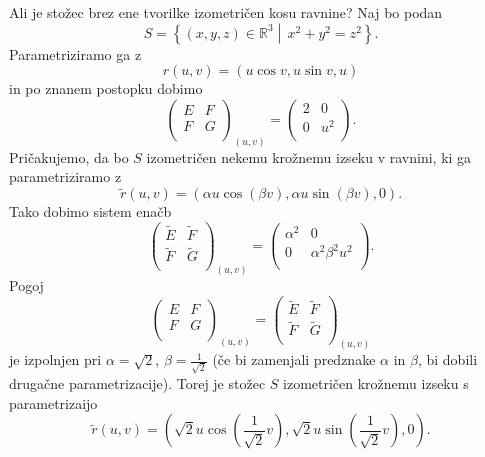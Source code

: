 \begin{primer}
 Ali je stožec brez ene tvorilke izometričen kosu ravnine? Naj bo podan 
 \begin{equation*} S = \left\{ (x,y,z) \in \mathbb{R}^3 \middle|\, x^2 + y^2  = z^2 \right\}.\end{equation*}
 Parametriziramo ga z
 \begin{equation*} r(u,v) = (u \cos v, u \sin v, u) \end{equation*}in po znanem postopku dobimo 
 \begin{equation*} \begin{pmatrix}
  E & F\\
  F & G\\
 \end{pmatrix}_{(u,v)} 
 = \begin{pmatrix}
  2 & 0\\
  0 & u^2\\
 \end{pmatrix}.\end{equation*}
Pričakujemo, da bo $S$ izometričen nekemu krožnemu izseku v ravnini, ki ga parametriziramo z 
\begin{equation*} \tilde{r}(u,v) = (\alpha u \cos(\beta v), \alpha u \sin(\beta v), 0).\end{equation*}Tako dobimo sistem enačb 
\begin{equation*} \begin{pmatrix}
  \tilde{E} & \tilde{F}\\
  \tilde{F} & \tilde{G}\\
 \end{pmatrix}_{(u,v)} 
 = \begin{pmatrix}
  \alpha^2 & 0\\
  0 & \alpha^2 \beta^2 u^2\\
 \end{pmatrix}.\end{equation*}
Pogoj  \begin{equation*} \begin{pmatrix}
  E & F\\
  F & G\\
 \end{pmatrix}_{(u,v)}
 = \begin{pmatrix}
  \tilde{E} & \tilde{F}\\
  \tilde{F} & \tilde{G}\\
 \end{pmatrix}_{(u,v)}\end{equation*}je izpolnjen pri $\alpha = \sqrt{2},\, \beta = \frac{1}{\sqrt{2}}$ (če bi zamenjali predznake $\alpha$ in $\beta$, bi dobili drugačne parametrizacije).
 Torej je stožec $S$ izometričen krožnemu izseku s parametrizaijo  
 \begin{equation*} \tilde{r}(u,v) = \left(\sqrt{2}  u \cos(\frac{1}{\sqrt{2}} v), \sqrt{2}  u \sin(\frac{1}{\sqrt{2}} v), 0 \right).\end{equation*}
\end{primer}


